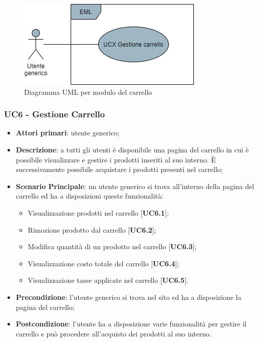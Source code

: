 \begin{figure}[H]
\centering
\includegraphics[scale=0.6]{res/UseCase/Immagini/CarrelloGenerale}
\caption{Diagramma UML per modulo del carrello}
\end{figure}

\subsubsection{UC6 - Gestione Carrello}
\begin{itemize}
\item \textbf{Attori primari}: utente generico;
\item \textbf{Descrizione}: a tutti gli utenti è disponibile una pagina del carrello in cui è possibile visualizzare e gestire i prodotti inseriti al suo interno. È successivamente possibile acquistare i prodotti presenti nel carrello;
\item \textbf{Scenario Principale}: un utente generico si trova all'interno della pagina del carrello ed ha a disposizioni queste funzionalità:
\begin{itemize}
\item Visualizzazione prodotti nel carrello [\textbf{UC6.1}];
\item Rimozione prodotto dal carrello [\textbf{UC6.2}];
\item Modifica quantità di un prodotto nel carrello [\textbf{UC6.3}];
\item Visualizzazione costo totale del carrello [\textbf{UC6.4}];
\item Visualizzazione tasse applicate nel carrello [\textbf{UC6.5}].
\end{itemize}
\item \textbf{Precondizione}: l'utente generico si trova nel sito ed ha a disposizione la pagina del carrello;
\item \textbf{Postcondizione}: l'utente ha a disposizione varie funzionalità per gestire il carrello e può procedere all'acquisto dei prodotti al suo interno.
\end{itemize}

